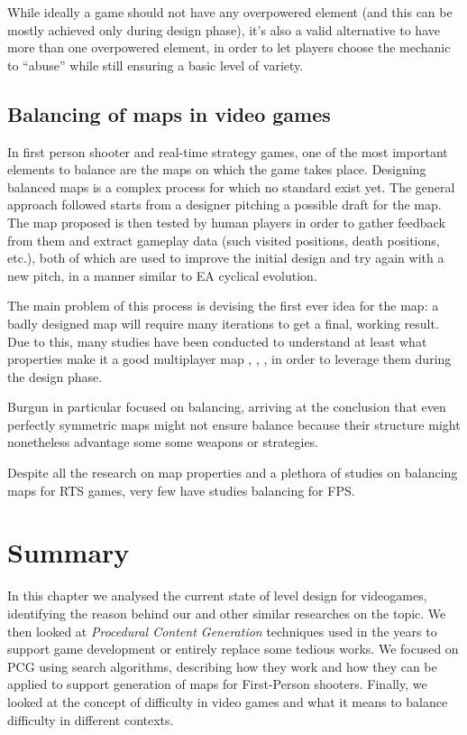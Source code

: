 While ideally a game should not have any overpowered element (and this can be mostly achieved only during design phase), it’s also a valid alternative to have more than one overpowered element, in order to let players choose the mechanic to “abuse” while still ensuring a basic level of variety.

\subsection{Balancing of maps in video games}
In first person shooter and real-time strategy games, one of the most important elements to balance are the maps on which the game takes place. Designing balanced maps is a complex process for which no standard exist yet. The general approach followed starts from a designer pitching a possible draft for the map. The map proposed is then tested by human players in order to gather feedback from them and extract gameplay data (such visited positions, death positions, etc.), both of which are used to improve the initial design and try again with a new pitch, in a manner similar to EA cyclical evolution.

The main problem of this process is devising the first ever idea for the map: a badly designed map will require many iterations to get a final, working result. Due to this, many studies have been conducted to understand at least what properties make it a good multiplayer map \cite{pascal_multiplayer}, \cite{epic_multiplayer}, \cite{dodger_multiplayer}, \cite{larsenleveldesignpatterns} in order to leverage them during the design phase. 

Burgun \cite{keith_multiplayer} in particular focused on balancing, arriving at the conclusion that even perfectly symmetric maps might not ensure balance because their structure might nonetheless advantage some some weapons or strategies. 

Despite all the research on map properties and a plethora of studies on balancing maps for RTS games, very few have studies balancing for FPS.

\section{Summary}
In this chapter we analysed the current state of level design for videogames, identifying the reason behind our and other similar researches on the topic.
We then looked at \textit{Procedural Content Generation} techniques used in the years to support game development or entirely replace some tedious works. We focused on PCG using search algorithms, describing how they work and how they can be applied to support generation of maps for First-Person shooters.
Finally, we looked at the concept of difficulty in video games and what it means to balance difficulty in different contexts.

